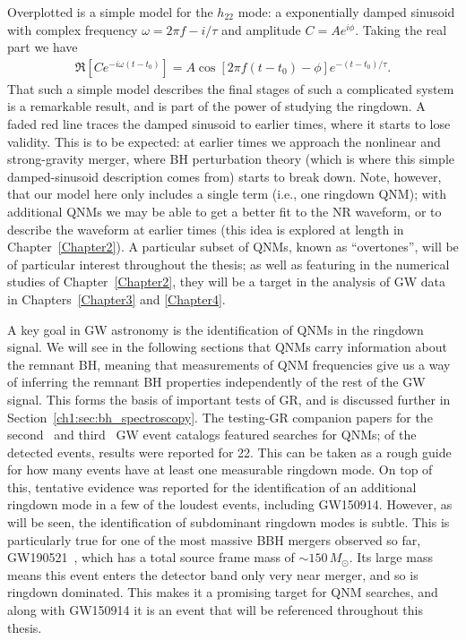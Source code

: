 Overplotted is a simple model for the $h_{22}$ mode: a exponentially damped sinusoid with complex frequency $\omega = 2\pi f - i/\tau$ and amplitude $C = Ae^{i\phi}$. 
Taking the real part we have
\begin{align}
    \Re[Ce^{-i\omega(t-t_0)}] = A\cos[2\pi f(t-t_0) - \phi]e^{-(t-t_0)/\tau}.
\end{align}
That such a simple model describes the final stages of such a complicated system is a remarkable result, and is part of the power of studying the ringdown.
A faded red line traces the damped sinusoid to earlier times, where it starts to lose validity.
This is to be expected: at earlier times we approach the nonlinear and strong-gravity merger, where BH perturbation theory (which is where this simple damped-sinusoid description comes from) starts to break down.
Note, however, that our model here only includes a single term (i.e., one ringdown QNM); with additional QNMs we may be able to get a better fit to the NR waveform, or to describe the waveform at earlier times (this idea is explored at length in Chapter~\ref{Chapter2}).
A particular subset of QNMs, known as ``overtones'', will be of particular interest throughout the thesis; as well as featuring in the numerical studies of Chapter~\ref{Chapter2}, they will be a target in the analysis of GW data in Chapters~\ref{Chapter3} and \ref{Chapter4}.

A key goal in GW astronomy is the identification of QNMs in the ringdown signal.
We will see in the following sections that QNMs carry information about the remnant BH, meaning that measurements of QNM frequencies give us a way of inferring the remnant BH properties independently of the rest of the GW signal.
This forms the basis of important tests of GR, and is discussed further in Section~\ref{ch1:sec:bh_spectroscopy}.
The testing-GR companion papers for the second~\cite{LIGOScientific:2020tif} and third~\cite{LIGOScientific:2021sio} GW event catalogs featured searches for QNMs; of the detected events, results were reported for 22.
This can be taken as a rough guide for how many events have at least one measurable ringdown mode.
On top of this, tentative evidence was reported for the identification of an additional ringdown mode in a few of the loudest events, including GW150914.
However, as will be seen, the identification of subdominant ringdown modes is subtle.
This is particularly true for one of the most massive BBH mergers observed so far, GW190521~\cite{LIGOScientific:2020iuh}, which has a total source frame mass of $\sim 150\,M_\odot$.
Its large mass means this event enters the detector band only very near merger, and so is ringdown dominated.
This makes it a promising target for QNM searches, and along with GW150914 it is an event that will be referenced throughout this thesis. 

